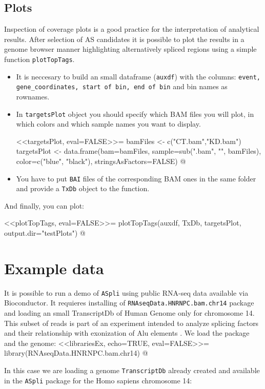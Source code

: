 \documentclass{article}
\begin{document}
\subsection{Plots}
Inspection of coverage plots is a good practice for the interpretation of analytical results. After selection of AS candidates it is possible to plot the results in a genome browser manner highlighting  alternatively spliced regions using a simple function \texttt{plotTopTags}.
\begin{itemize}
\item It is neccesary to build an small dataframe (\texttt{auxdf}) with the columns:
\texttt{event, gene\_coordinates, start of bin, end of bin} and bin names as rownames.
\item In \texttt{targetsPlot} object you should specify which BAM files you will plot, in which colors and which sample names you want to display. 

<<targetsPlot, eval=FALSE>>=
bamFiles <- c("CT.bam","KD.bam")
targetsPlot <- data.frame(bam=bamFiles, 
                        sample=sub(".bam", "", bamFiles), 
                        color=c("blue", "black"), 
                        stringsAsFactors=FALSE)
@
\item You have to put \texttt{BAI} files of the corresponding BAM ones in the same folder and provide a \texttt{TxDb} object to the function. 
\end{itemize}

And finally, you can plot:

<<plotTopTags, eval=FALSE>>=
plotTopTags(auxdf, 
            TxDb, 
            targetsPlot, 
            output.dir="testPlots")
@

\section{Example data}
It is possible to run a demo of \texttt{ASpli} using public RNA-seq data available via Bioconductor. It requieres installing of \texttt{RNAseqData.HNRNPC.bam.chr14} package and loading  an small TranscriptDb of Human Genome only for chromosome 14. This subset of reads is part of an experiment intended to analyze splicing factors and their relationship with exonization of Alu elements \cite{Zarnack2013453}. We load the package and the genome:
<<librariesEx, echo=TRUE, eval=FALSE>>=
library(RNAseqData.HNRNPC.bam.chr14)
@

In this case we are loading a genome \texttt{TranscriptDb} already created and available in the  \texttt{ASpli} package for the Homo sapiens chromosome 14:
\end{document}
